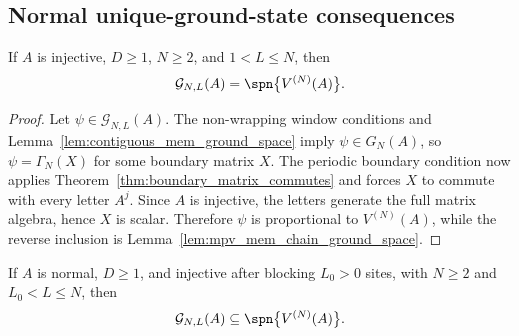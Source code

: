 \subsection{Normal unique-ground-state consequences}\label{subsec:normal_unique_ground_state}

\begin{theorem}%
    \label{thm:chain_ground_space_eq_mpv_blk}
    \leanok
    If $A$ is injective, $D \ge 1$, $N \ge 2$, and $1 < L \le N$, then
    \[
        \mathcal G_{N,L}(A) = \spn\bigl\{V^{(N)}(A)\bigr\}.
    \]
\end{theorem}

\begin{proof}
    \leanok
    Let $\psi \in \mathcal G_{N,L}(A)$. The non-wrapping window conditions and
    Lemma~\ref{lem:contiguous_mem_ground_space} imply $\psi \in G_{N}(A)$, so
    $\psi = \Gamma_{N}(X)$ for some boundary matrix $X$. The periodic boundary condition now
    applies Theorem~\ref{thm:boundary_matrix_commutes} and forces $X$ to commute with
    every letter $A^{j}$. Since $A$ is injective, the letters generate the full matrix
    algebra, hence $X$ is scalar. Therefore $\psi$ is proportional to $V^{(N)}(A)$, while
    the reverse inclusion is Lemma~\ref{lem:mpv_mem_chain_ground_space}.
\end{proof}

\begin{theorem}
    \label{thm:normal_range_reduction_containment}
    \leanok
    If $A$ is normal, $D \ge 1$, and injective after blocking $L_0>0$ sites, with
    $N \ge 2$ and $L_0 < L \le N$, then
    \[
        \mathcal G_{N,L}(A) \subseteq \spn\bigl\{V^{(N)}(A)\bigr\}.
    \]
\end{theorem}

